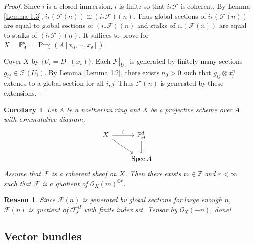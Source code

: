 \documentclass{ctexart}
\newtheorem{reason}{Reason}[section]
\newtheorem{corollary}{Corollary}[section]
\newcommand{\spec}{\operatorname{Spec}}
\newcommand{\proj}{\operatorname{Proj}}
\begin{document}
\begin{proof}
    Since $i$ is a closed immersion, $i$ is finite so that $i_{\ast}\mathcal{F}$ is coherent.
    By Lemma \ref{Lemma 1.3}, $i_{\ast}(\mathcal{F}(n)) \cong (i_{\ast}\mathcal{F})(n)$.
    Thus global sections of $i_{\ast}(\mathcal{F}(n))$ are equal to global sections of $(i_{\ast}\mathcal{F})(n)$ and stalks of $i_{\ast}(\mathcal{F}(n))$ are equal to stalks of $(i_{\ast}\mathcal{F})(n)$.
    It suffices to prove for $X = \mathbb{P}_{A}^{d} = \proj(A[x_{0}, \cdots, x_{d}])$.
    \par
    Cover $X$ by $\{U_{i} = D_{+}(x_{i})\}$.
    Each $\mathcal{F}\big{|}_{U_{i}}$ is generated by finitely many sections $g_{ij}\in \mathcal{F}(U_{i})$.
    By Lemma \ref{Lemma 1.2}, there exists $n_{0} > 0$ such that $g_{ij} \otimes x_{i}^{n}$ extends to a global section for all $i,j$.
    Thus $\mathcal{F}(n)$ is generated by these extensions.
\end{proof}
\begin{corollary}
    Let $A$ be a noetherian ring and $X$ be a projective scheme over $A$ with commutative diagram, 
    \begin{equation}
        \begin{tikzcd}
            X \arrow[r, "i"] \arrow[dr] &
            \mathbb{P}_{A}^{d} \arrow[d] \\
            & \spec A
        \end{tikzcd}
    \end{equation}
    Assume that $\mathcal{F}$ is a coherent sheaf on $X$.
    Then there exists $m\in \mathbb{Z}$ and $r < \infty$ such that $\mathcal{F}$ is a quotient of $\mathcal{O}_{X}(m)^{\oplus r}$.
    \label{Corollary 1.1}
\end{corollary}
\begin{reason}
    Since $\mathcal{F}(n)$ is generated bv global sections for large enough $n$,
    $\mathcal{F}(n)$ is quotient of $\mathcal{O}_{X}^{\oplus I}$ with finite index set.
    Tensor by $\mathcal{O}_{X}(-n)$, done!
\end{reason}

\subsection{Vector bundles}
\label{subsection:Vector_Bundles_Vector_bundles}
\end{document}
